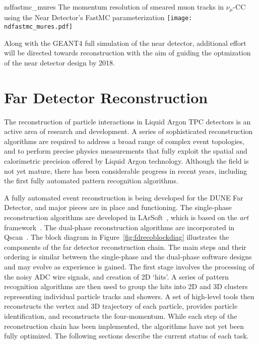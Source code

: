 \begin{cdrfigure}{ndfastmc_mures}
{The momentum resolution of smeared muon tracks in $\nu_\mu$-CC using the Near Detector's FastMC parameterization}
\texttt{[image: ndfastmc\_mures.pdf]}
\end{cdrfigure}

Along with the GEANT4 full simulation of the near detector, additional effort will be directed
towards reconstruction with the aim of guiding the optmization of the near detector design by 2018.

\section{Far Detector Reconstruction}
\label{annex:detectors-sc-physics-software-reconstruction-fd}

The reconstruction of particle interactions in Liquid Argon TPC
detectors is an active area of research and development.
A series of sophisticated reconstruction algorithms are required to
address a broad range of complex event topologies, and to perform
precise physics measurements that fully exploit the spatial and 
calorimetric precision offered by Liquid Argon technology.
Although the field is not yet mature, there has been considerable
progress in recent years, including the first fully automated
pattern recognition algorithms. 

A fully automated event reconstruction is being developed for the
DUNE Far Detector, and major pieces are in place and functioning.
The single-phase reconstruction algorithms are developed in LArSoft~\cite{Church:2013hea},
which is based on the {\it art} framework~\cite{Green:2012gv}.  The dual-phase reconstruction
algorithms are incorporated in Qscan~\cite{lussi:thesis}.
The block diagram in Figure~\ref{fig:fdrecoblockdiag}
illustrates the components of the far detector reconstruction chain.  The main steps and
their ordering is similar between the single-phase and the dual-phase software designs
and may evolve as experience is gained. 
The first stage involves the processing of the noisy ADC wire signals,
and creation of 2D `hits'. A series of pattern recognition algorithms
are then used to group the hits into 2D and 3D clusters representing 
individual particle tracks and showers. A set of high-level tools
then reconstructs the vertex and 3D trajectory of each particle,
provides particle identification, and reconstructs the four-momentum.
While each step of the reconstruction chain has been implemented,
the algorithms have not yet been fully optimized.
The following sections describe the current status of each task.

